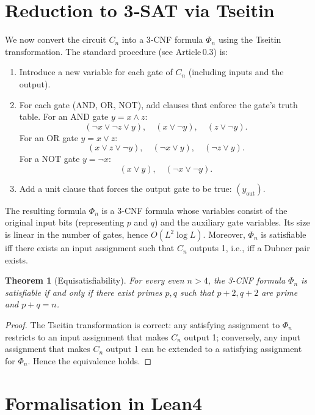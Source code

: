 \documentclass[11pt,a4paper]{article}
\newtheorem{theorem}{Theorem}[section]
\begin{document}
\section{Reduction to 3‑SAT via Tseitin}

We now convert the circuit \(C_n\) into a 3‑CNF formula \(\Phi_n\) using the Tseitin transformation. The standard procedure (see Article 0.3) is:

\begin{enumerate}
\item Introduce a new variable for each gate of \(C_n\) (including inputs and the output).
\item For each gate (AND, OR, NOT), add clauses that enforce the gate’s truth table. For an AND gate \(y = x \land z\):
   \[
   (\neg x \lor \neg z \lor y),\quad (x \lor \neg y),\quad (z \lor \neg y).
   \]
   For an OR gate \(y = x \lor z\):
   \[
   (x \lor z \lor \neg y),\quad (\neg x \lor y),\quad (\neg z \lor y).
   \]
   For a NOT gate \(y = \neg x\):
   \[
   (x \lor y),\quad (\neg x \lor \neg y).
   \]
\item Add a unit clause that forces the output gate to be true: \((y_{\text{out}})\).
\end{enumerate}

The resulting formula \(\Phi_n\) is a 3‑CNF formula whose variables consist of the original input bits (representing \(p\) and \(q\)) and the auxiliary gate variables. Its size is linear in the number of gates, hence \(O(L^2 \log L)\). Moreover, \(\Phi_n\) is satisfiable iff there exists an input assignment such that \(C_n\) outputs 1, i.e., iff a Dubner pair exists.

\begin{theorem}[Equisatisfiability]\label{thm:equiv}
For every even \(n > 4\), the 3‑CNF formula \(\Phi_n\) is satisfiable if and only if there exist primes \(p,q\) such that \(p+2,q+2\) are prime and \(p+q = n\).
\end{theorem}
\begin{proof}
The Tseitin transformation is correct: any satisfying assignment to \(\Phi_n\) restricts to an input assignment that makes \(C_n\) output 1; conversely, any input assignment that makes \(C_n\) output 1 can be extended to a satisfying assignment for \(\Phi_n\). Hence the equivalence holds.
\end{proof}

\section{Formalisation in Lean4}
\end{document}
